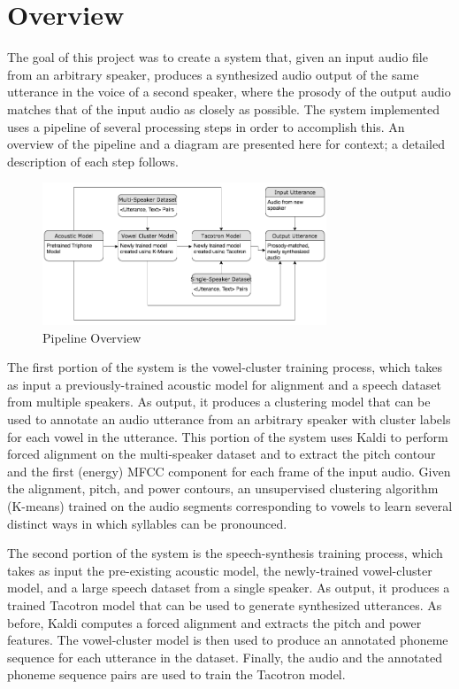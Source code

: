 \documentclass{article}
\begin{document}
\section{Overview}
\label{sec:overview}
The goal of this project was to create a system that, given an input audio file from an arbitrary speaker, produces a synthesized audio output of the same utterance in the voice of a second speaker, where the prosody of the output audio matches that of the input audio as closely as possible.
The system implemented uses a pipeline of several processing steps in order to accomplish this.
An overview of the pipeline and a diagram are presented here for context; a detailed description of each step follows.

\begin{figure}[htb]

\begin{minipage}[b]{1.0\linewidth}
  \centering
  \centerline{\includegraphics[width=8.5cm]{Overall_Pipeline}}
\end{minipage}
\caption{Pipeline Overview}
\label{fig:overview}
\end{figure}

The first portion of the system is the vowel-cluster training process, which takes as input a previously-trained acoustic model for alignment and a speech dataset from multiple speakers. As output, it produces a clustering model that can be used to annotate an audio utterance from an arbitrary speaker with cluster labels for each vowel in the utterance. This portion of the system uses Kaldi to perform forced alignment on the multi-speaker dataset and to extract the pitch contour and the first (energy) MFCC component for each frame of the input audio. Given the alignment, pitch, and power contours, an unsupervised clustering algorithm (K-means) trained on the audio segments corresponding to vowels to learn several distinct ways in which syllables can be pronounced.

The second portion of the system is the speech-synthesis training process, which takes as input the pre-existing acoustic model, the newly-trained vowel-cluster model, and a large speech dataset from a single speaker. As output, it produces a trained Tacotron model that can be used to generate synthesized utterances. As before, Kaldi computes a forced alignment and extracts the pitch and power features.
The vowel-cluster model is then used to produce an annotated phoneme sequence for each utterance in the dataset.
Finally, the audio and the annotated phoneme sequence pairs are used to train the Tacotron model.
\end{document}
